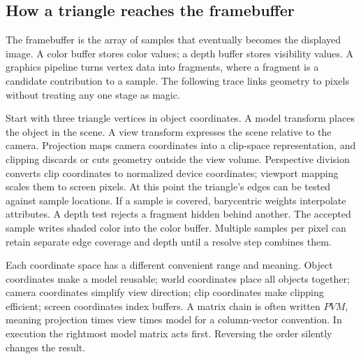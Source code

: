 \subsection{How a triangle reaches the framebuffer}\label{03-visual-computing-i-ch015-how-a-triangle-reaches-the-framebuffer}

The framebuffer is the array of samples that eventually becomes the displayed image. A color buffer stores color values; a depth buffer stores visibility values. A graphics pipeline turns vertex data into fragments, where a fragment is a candidate contribution to a sample. The following trace links geometry to pixels without treating any one stage as magic.

Start with three triangle vertices in object coordinates. A model transform places the object in the scene. A view transform expresses the scene relative to the camera. Projection maps camera coordinates into a clip-space representation, and clipping discards or cuts geometry outside the view volume. Perspective division converts clip coordinates to normalized device coordinates; viewport mapping scales them to screen pixels. At this point the triangle's edges can be tested against sample locations. If a sample is covered, barycentric weights interpolate attributes. A depth test rejects a fragment hidden behind another. The accepted sample writes shaded color into the color buffer. Multiple samples per pixel can retain separate edge coverage and depth until a resolve step combines them.

Each coordinate space has a different convenient range and meaning. Object coordinates make a model reusable; world coordinates place all objects together; camera coordinates simplify view direction; clip coordinates make clipping efficient; screen coordinates index buffers. A matrix chain is often written \(PVM\), meaning projection times view times model for a column-vector convention. In execution the rightmost model matrix acts first. Reversing the order silently changes the result.

